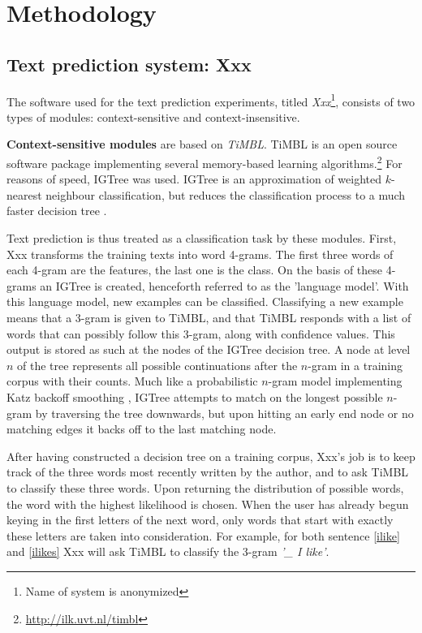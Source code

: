 \documentclass[11pt]{article}
\begin{document}
\section{Methodology}

\subsection{Text prediction system: Xxx}

The software used for the text prediction experiments, titled \emph{Xxx}\footnote{Name of system is anonymized}, consists of two types of modules: context-sensitive and context-insensitive. 

\textbf{Context-sensitive modules} are based on \emph{TiMBL}. TiMBL is an open source software package implementing several memory-based learning algorithms.\footnote{\url{http://ilk.uvt.nl/timbl}} For reasons of speed, IGTree was used. IGTree is an approximation of weighted $k$-nearest neighbour classification, but reduces the classification process to a much faster decision tree \cite{daelemans97}.

Text prediction is thus treated as a classification task by these modules. First, Xxx transforms the training texts into word 4-grams. The first three words of each 4-gram are the features, the last one is the class. On the basis of these 4-grams an IGTree is created, henceforth referred to as the 'language model'. With this language model, new examples can be classified. Classifying a new example means that a 3-gram is given to TiMBL, and that TiMBL responds with a list of words that can possibly follow this 3-gram, along with confidence values. This output is stored as such at the nodes of the IGTree decision tree. A node at level $n$ of the tree represents all possible continuations after the $n$-gram in a training corpus with their counts. Much like a probabilistic $n$-gram model implementing Katz backoff smoothing \cite{katz87}, IGTree attempts to match on the longest possible $n$-gram by traversing the tree downwards, but upon hitting an early end node or no matching edges it backs off to the last matching node.

After having constructed a decision tree on a training corpus, Xxx's job is to keep track of the three words most recently written by the author, and to ask TiMBL to classify these three words. 
Upon returning the distribution of possible words, the word with the highest likelihood is chosen. When the user has already begun keying in the first letters of the next word, only words that start with exactly these letters are taken into consideration. For example, for both sentence \ref{ilike} and \ref{ilikes} Xxx will ask TiMBL to classify the 3-gram \emph{'\_ I like'}.
\end{document}
